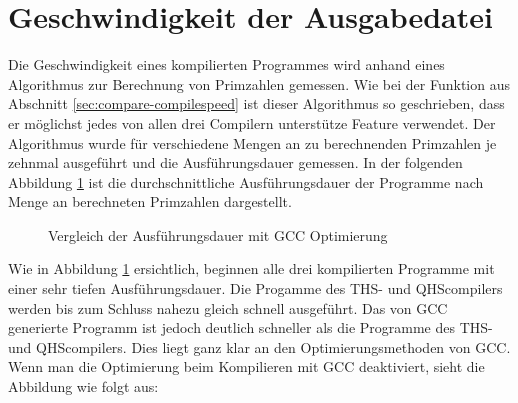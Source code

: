 \section{Geschwindigkeit der Ausgabedatei} \label{sec:execute_speed}
Die Geschwindigkeit eines kompilierten Programmes wird anhand eines Algorithmus zur Berechnung von Primzahlen gemessen. Wie bei der Funktion aus Abschnitt \ref{sec:compare-compilespeed} ist dieser Algorithmus so geschrieben,
dass er möglichst jedes von allen drei Compilern unterstütze Feature verwendet. Der Algorithmus wurde für verschiedene Mengen an zu berechnenden Primzahlen je zehnmal ausgeführt und die Ausführungsdauer gemessen.
In der folgenden Abbildung \ref{fig:executespeed_optimized} ist die durchschnittliche Ausführungsdauer der Programme nach Menge an berechneten Primzahlen dargestellt.

\begin{figure}[H]
    \centering
    \label{fig:executespeed_optimized}
    \caption{Vergleich der Ausführungsdauer mit GCC Optimierung}
\end{figure}

Wie in Abbildung \ref{fig:executespeed_optimized} ersichtlich, beginnen alle drei kompilierten Programme mit einer sehr tiefen Ausführungsdauer.
Die Progamme des THS- und QHScompilers werden bis zum Schluss nahezu gleich schnell ausgeführt.
Das von GCC generierte Programm ist jedoch deutlich schneller als die Programme des THS- und QHScompilers.
Dies liegt ganz klar an den Optimierungsmethoden von GCC. Wenn man die Optimierung beim Kompilieren mit GCC deaktiviert, sieht die Abbildung wie folgt aus:

